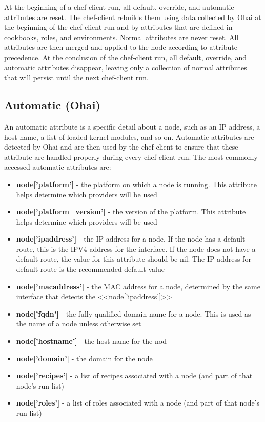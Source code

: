 At the beginning of a chef-client run, all default, override, and automatic attributes are reset. The chef-client rebuilds them using data collected by Ohai at the beginning of the chef-client run and by attributes that are defined in cookbooks, roles, and environments. Normal attributes are never reset. All attributes are then merged and applied to the node according to attribute precedence. At the conclusion of the chef-client run, all default, override, and automatic attributes disappear, leaving only a collection of normal attributes that will persist until the next chef-client run.

\subsection{Automatic (Ohai)}

An automatic attribute is a specific detail about a node, such as an IP address, a host name, a list of loaded kernel modules, and so on. Automatic attributes are detected by Ohai and are then used by the chef-client to ensure that these attribute are handled properly during every chef-client run. The most commonly accessed automatic attributes are:

\begin{itemize}
  \item \textbf{node['platform']} - the platform on which a node is running. This attribute helps determine which providers will be used
  \item \textbf{node['platform\_version']} - the version of the platform. This attribute helps determine which providers will be used
  \item \textbf{node['ipaddress']} - the IP address for a node. If the node has a default route, this is the IPV4 address for the interface. If the node does not have a default route, the value for this attribute should be nil. The IP address for default route is the recommended default value
  \item \textbf{node['macaddress']} - the MAC address for a node, determined by the same interface that detects the <<node['ipaddress']>>
  \item \textbf{node['fqdn']} - the fully qualified domain name for a node. This is used as the name of a node unless otherwise set
  \item \textbf{node['hostname']} - the host name for the nod
  \item \textbf{node['domain']} - the domain for the node
  \item \textbf{node['recipes']} - a list of recipes associated with a node (and part of that node’s run-list)
  \item \textbf{node['roles']} - a list of roles associated with a node (and part of that node’s run-list)
\end{itemize}

